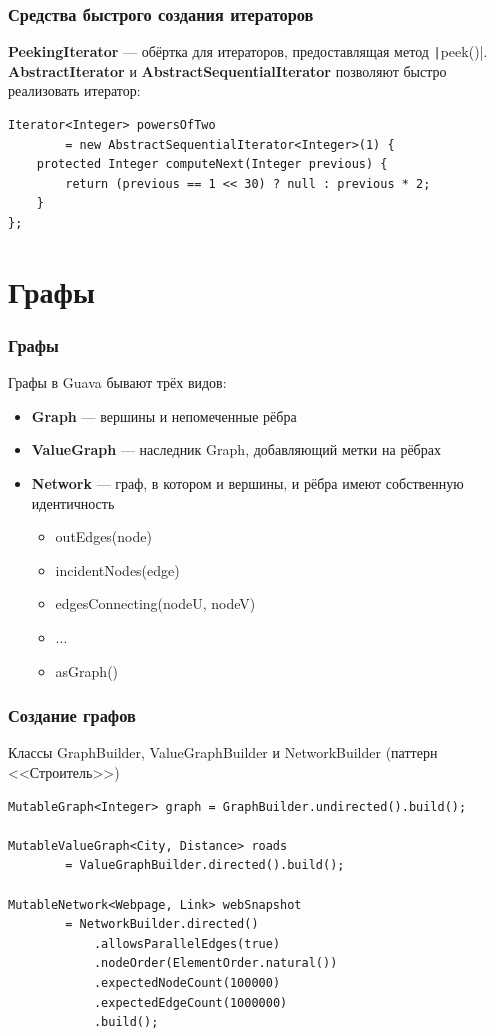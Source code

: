 \documentclass[xetex,mathserif,serif]{beamer}
\begin{document}
	\begin{frame}[fragile]
		\frametitle{Средства быстрого создания итераторов}
		\textbf{PeekingIterator} --- обёртка для итераторов, предоставлящая метод \texttt|peek()|. \textbf{AbstractIterator} и \textbf{AbstractSequentialIterator} позволяют быстро реализовать итератор:
		
		\begin{verbatim}
Iterator<Integer> powersOfTwo 
        = new AbstractSequentialIterator<Integer>(1) {
    protected Integer computeNext(Integer previous) {
        return (previous == 1 << 30) ? null : previous * 2;
    }
};
		\end{verbatim}
\end{frame}

	\section{Графы}

	\begin{frame}
		\frametitle{Графы}
		Графы в Guava бывают трёх видов:
		\begin{itemize}
			\item \textbf{Graph} --- вершины и непомеченные рёбра
			\item \textbf{ValueGraph} --- наследник Graph, добавляющий метки на рёбрах
			\item \textbf{Network} --- граф, в котором и вершины, и рёбра имеют собственную идентичность
			\begin{itemize}
				\item outEdges(node)
				\item incidentNodes(edge)
				\item edgesConnecting(nodeU, nodeV)
				\item ...
				\item asGraph()
			\end{itemize}
		\end{itemize}
	\end{frame}

	\begin{frame}[fragile]
		\frametitle{Создание графов}
		Классы GraphBuilder, ValueGraphBuilder и NetworkBuilder (паттерн <<Строитель>>)
		\begin{verbatim}
MutableGraph<Integer> graph = GraphBuilder.undirected().build();

MutableValueGraph<City, Distance> roads 
        = ValueGraphBuilder.directed().build();

MutableNetwork<Webpage, Link> webSnapshot 
        = NetworkBuilder.directed()
            .allowsParallelEdges(true)
            .nodeOrder(ElementOrder.natural())
            .expectedNodeCount(100000)
            .expectedEdgeCount(1000000)
            .build();
		\end{verbatim}
\end{frame}
\end{document}
